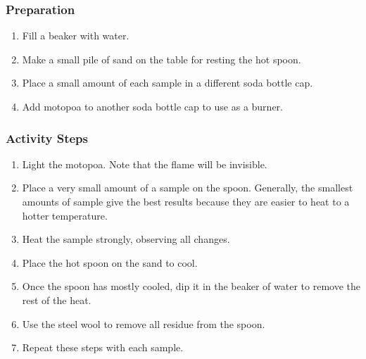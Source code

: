 \subsubsection{Preparation}
\begin{enumerate}
\item{Fill a beaker with water.}
\item{Make a small pile of sand on the table for resting the hot spoon.}
\item{Place a small amount of each sample in a different soda bottle cap.}
\item{Add motopoa to another soda bottle cap to use as a burner.}
\end{enumerate}

\subsubsection{Activity Steps}
\begin{enumerate}
\item{Light the motopoa. Note that the flame will be invisible.}
\item{Place a very small amount of a sample on the spoon. Generally, the smallest amounts of sample give the best results because they are easier to heat to a hotter temperature.}
\item{Heat the sample strongly, observing all changes.}
\item{Place the hot spoon on the sand to cool.}
\item{Once the spoon has mostly cooled, dip it in the beaker of water to remove the rest of the heat.}
\item{Use the steel wool to remove all residue from the spoon.}
\item{Repeat these steps with each sample.}
\end{enumerate}

